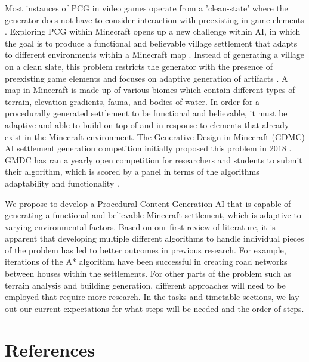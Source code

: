 \documentclass[11pt, oneside]{article}
\begin{document}
\begin{normalsize}
Most instances of PCG in video games operate from a 'clean-state' where the generator does not have to consider interaction with preexisting in-game elements \cite{green_organic_2019}. Exploring PCG within Minecraft opens up a new challenge within AI, in which the goal is to produce a functional and believable village settlement that adapts to different environments within a Minecraft map \cite{salge_generative_2019}. Instead of generating a village on a clean slate, this problem restricts the generator with the presence of preexisting game elements and focuses on adaptive generation of artifacts \cite{green_organic_2019}. A map in Minecraft is made up of various biomes which contain different types of terrain, elevation gradients, fauna, and bodies of water. In order for a procedurally generated settlement to be functional and believable, it must be adaptive and able to build on top of and in response to elements that already exist in the Minecraft environment. The Generative Design in Minecraft (GDMC) AI settlement generation competition initially proposed this problem in 2018 \cite{salge_generative_2018}. GMDC has ran a yearly open competition for researchers and students to submit their algorithm, which is scored by a panel in terms of the algorithms adaptability and functionality \cite{fridh_settlement_nodate}. 

We propose to develop a Procedural Content Generation AI that is capable of generating a functional and believable Minecraft settlement, which is adaptive to varying environmental factors. Based on our first review of literature, it is apparent that developing multiple different algorithms to handle individual pieces of the problem has led to better outcomes in previous research. For example, iterations of the A* algorithm have been successful in creating road networks between houses within the settlements. For other parts of the problem such as terrain analysis and building generation, different approaches will need to be employed that require more research. In the tasks and timetable sections, we lay out our current expectations for what steps will be needed and the order of steps.

\end{normalsize}


\newpage



\section{References}
\label{references}
\nocite{*}
\printbibliography[heading=none]
\end{document}
